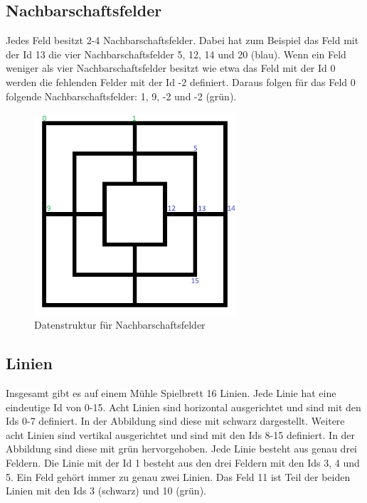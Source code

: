 \documentclass[oneside]{ausarbeitung}
\begin{document}
\subsection{Nachbarschaftsfelder}

Jedes Feld besitzt 2-4 Nachbarschaftsfelder. Dabei hat zum Beispiel das Feld mit der Id 13 die vier Nachbarschaftsfelder 5, 12, 14 und 20 (blau). Wenn ein Feld weniger als vier Nachbarschaftsfelder besitzt wie etwa das Feld mit der Id 0 werden die fehlenden Felder mit der Id -2 definiert. Daraus folgen für das Feld 0 folgende Nachbarschaftsfelder: 1, 9, -2 und -2 (grün).

\begin{figure}[ht]
	\centering
	\includegraphics[width=7.5cm,height=7.5cm]{images/gameboardNeighborfields.png}
	\caption[Datenstruktur für Nachbarschaftsfelder]{Datenstruktur für Nachbarschaftsfelder}
\end{figure}

\subsection{Linien}

Insgesamt gibt es auf einem Mühle Spielbrett 16 Linien. Jede Linie hat eine eindeutige Id von 0-15. Acht Linien sind horizontal ausgerichtet und sind mit den Ids 0-7 definiert. In der Abbildung sind diese mit schwarz dargestellt. Weitere acht Linien sind vertikal ausgerichtet und sind mit den Ids 8-15 definiert. In der Abbildung sind diese mit grün hervorgehoben. Jede Linie besteht aus genau drei Feldern. Die Linie mit der Id 1 besteht aus den drei Feldern mit den Ids 3, 4 und 5. Ein Feld gehört immer zu genau zwei Linien. Das Feld 11 ist Teil der beiden Linien mit den Ids 3 (schwarz) und 10 (grün).
\end{document}
